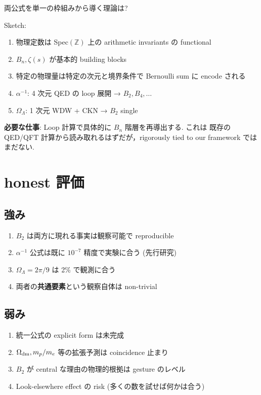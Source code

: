 \documentclass[11pt,a4paper]{article}
\begin{document}
両公式を単一の枠組みから導く理論は?

Sketch:
\begin{enumerate}
\item 物理定数は Spec$(\mathbb{Z})$ 上の arithmetic invariants の
functional
\item $B_n, \zeta(s)$ が基本的 building blocks
\item 特定の物理量は特定の次元と境界条件で Bernoulli sum に encode
される
\item $\alpha^{-1}$: 4 次元 QED の loop 展開 → $B_2, B_4, \ldots$
\item $\Omega_\Lambda$: 1 次元 WDW + CKN → $B_2$ single
\end{enumerate}

\textbf{必要な仕事}: Loop 計算で具体的に $B_n$ 階層を再導出する. これは
既存の QED/QFT 計算から読み取れるはずだが，rigorously tied to our
framework ではまだない.

\section{honest 評価}

\subsection{強み}

\begin{enumerate}
\item $B_2$ は両方に現れる事実は観察可能で reproducible
\item $\alpha^{-1}$ 公式は既に $10^{-7}$ 精度で実験に合う (先行研究)
\item $\Omega_\Lambda = 2\pi/9$ は 2\% で観測に合う
\item 両者の\textbf{共通要素}という観察自体は non-trivial
\end{enumerate}

\subsection{弱み}

\begin{enumerate}
\item 統一公式の explicit form は未完成
\item $\Omega_{\rm dm}, m_p/m_e$ 等の拡張予測は coincidence 止まり
\item $B_2$ が central な理由の物理的根拠は gesture のレベル
\item Look-elsewhere effect の risk (多くの数を試せば何かは合う)
\end{enumerate}
\end{document}
